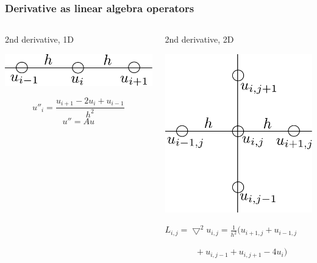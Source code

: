 \documentclass{beamer}
\begin{document}
\begin{frame}[fragile]
  \frametitle{Derivative as linear algebra operators}

  \begin{columns}
    \begin{block}{2nd derivative, 1D}

      \includegraphics[width=\linewidth]{slides-figures/1d.pdf}

      $$u''_i = \frac{u_{i+1}-2u_i+u_{i-1}}{h^2}$$
      $$u'' = Au$$
    \end{block}
    
    \begin{block}{2nd derivative, 2D}
      \begin{center}
        \includegraphics[width=.6\linewidth]{slides-figures/2d.pdf}
      \end{center}
      
        $L_{i,j} = \bigtriangledown^2 u_{i,j} = \frac{1}{h^2} (u_{i+1,j}  +u_{i-1,j}$
        
        $~~~~~~~~~~~~~~~~+u_{i,j-1}+u_{i,j+1}-4u_i)$
    \end{block}    
    
  \end{columns}
\end{frame}
\end{document}
